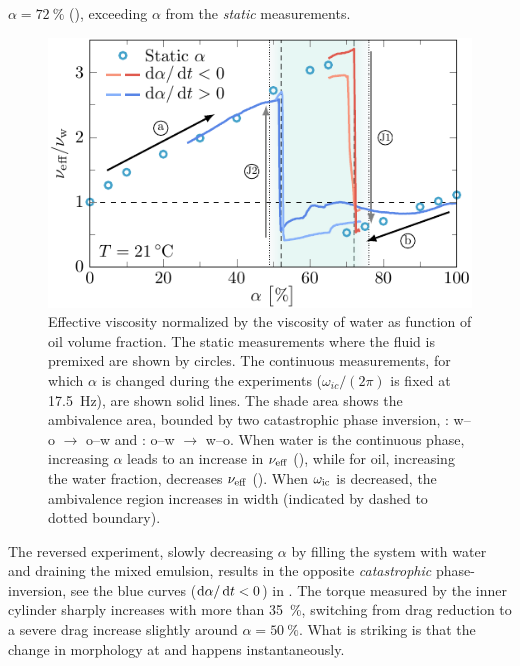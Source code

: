 $\alpha=\SI{72}{\percent}$ (), exceeding 
$\alpha$ from the \emph{static} measurements.
%
\begin{figure}[t]
    \centering
    \includegraphics{viscosityfit.pdf}
    \caption{%
    Effective viscosity normalized by the viscosity of water as function of
    oil volume fraction. The static measurements where the fluid is premixed
    are shown by circles. The continuous measurements, for which $\alpha$ is
    changed during the experiments ($\omega_{ic}/(2\pi)$ is fixed at
    \SI{17.5}{\hertz}), are shown solid lines.
    The shade area shows
    the ambivalence area, bounded by two catastrophic phase inversion,
    : w--o $\rightarrow$ o--w and
    : o--w $\rightarrow$ w--o. When water is the
    continuous phase, increasing $\alpha$ leads to an increase in $\nu_\text{eff}$
    (), while for oil, increasing the water
    fraction, decreases $\nu_\text{eff}$ ().
    When $\omega_\text{ic}$ is decreased, the
    ambivalence region increases in width (indicated by dashed to dotted
    boundary).
    }
    \label{fig:viscosity}
\end{figure}
The reversed experiment, slowly decreasing $\alpha$ by filling the system with
water and draining the mixed emulsion, results in the opposite
\emph{catastrophic} phase-inversion, see the blue curves
($\dif{\alpha}/\dif{t} < 0$) in .
The torque measured by the inner cylinder sharply increases with more than
\SI{35}{\percent}, switching from drag reduction to a severe drag increase
slightly around $\alpha=\SI{50}{\percent}$.
What is striking is that the change in morphology at
 and  happens instantaneously.
